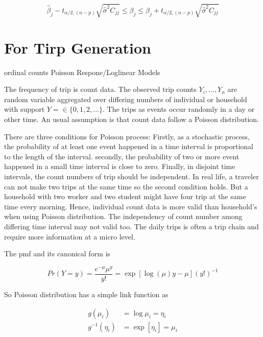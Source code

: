 \documentclass[
  11pt,
  openany]{memoir}
\begin{document}
\begin{equation}
\hat\beta_j-t_{\alpha/2,(n-p)}\sqrt{\hat\sigma^2C_{jj}}\le \beta_j \le \hat\beta_j+t_{\alpha/2,(n-p)}\sqrt{\hat\sigma^2C_{jj}}
\end{equation}

\pagebreak

\hypertarget{for-tirp-generation}{%
\section{For Tirp Generation}\label{for-tirp-generation}}

ordinal counts Poisson Respone/Loglinear Models

The frequency of trip is count data. The observed trip counts \(Y_i,...,Y_n\) are random variable aggregated over differing numbers of individual or household with support \(Y=\in\{0,1,2,...\}\).
The trips as events occur randomly in a day or other time.
An usual assumption is that count data follow a Poisson distribution.

There are three conditions for Poisson process:
Firstly, as a stochastic process, the probability of at least one event happened in a time interval is proportional to the length of the interval.
secondly, the probability of two or more event happened in a small time interval is close to zero.
Finally, in disjoint time intervals, the count numbers of trip should be independent.
In real life, a traveler can not make two trips at the same time so the second condition holds.
But a household with two worker and two student might have four trip at the same time every morning. Hence, individual count data is more valid than household's when using Poisson distribution.
The independency of count number among differing time interval may not valid too. The daily trips is often a trip chain and require more information at a micro level.

The pmf and its canonical form is

\begin{equation}
Pr(Y=y) = \frac{e^{-\mu}\mu^y}{y!}=\exp[\log(\mu) y-\mu](y!)^{-1}
\end{equation}

So Poisson distribution has a simple link function as

\begin{equation}
\begin{split}
g(\mu_i)&=\log\mu_i=\eta_i\\
g^{-1}(\eta_i)&=\exp[\eta_i]=\mu_i\\
\end{split}
\label{eq:pois-link}
\end{equation}
\end{document}
